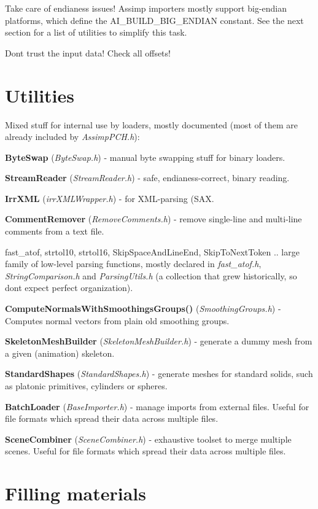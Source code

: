 \begin{DoxyItemize}
\item Take care of endianess issues! Assimp importers mostly support big-\/endian platforms, which define the {\ttfamily A\+I\+\_\+\+B\+U\+I\+L\+D\+\_\+\+B\+I\+G\+\_\+\+E\+N\+D\+I\+A\+N} constant. See the next section for a list of utilities to simplify this task.  
\item Don\textquotesingle{}t trust the input data! Check all offsets!  
\end{DoxyItemize}\hypertarget{extend_util}{}\section{Utilities}\label{extend_util}
Mixed stuff for internal use by loaders, mostly documented (most of them are already included by {\itshape Assimp\+P\+C\+H.\+h})\+: 
\begin{DoxyItemize}
\item {\bfseries Byte\+Swap} ({\itshape Byte\+Swap.\+h}) -\/ manual byte swapping stuff for binary loaders. 
\item {\bfseries Stream\+Reader} ({\itshape Stream\+Reader.\+h}) -\/ safe, endianess-\/correct, binary reading. 
\item {\bfseries Irr\+X\+M\+L} ({\itshape irr\+X\+M\+L\+Wrapper.\+h}) -\/ for X\+M\+L-\/parsing (S\+A\+X. 
\item {\bfseries Comment\+Remover} ({\itshape Remove\+Comments.\+h}) -\/ remove single-\/line and multi-\/line comments from a text file. 
\item fast\+\_\+atof, strtol10, strtol16, Skip\+Space\+And\+Line\+End, Skip\+To\+Next\+Token .. large family of low-\/level parsing functions, mostly declared in {\itshape fast\+\_\+atof.\+h}, {\itshape String\+Comparison.\+h} and {\itshape Parsing\+Utils.\+h} (a collection that grew historically, so don\textquotesingle{}t expect perfect organization).  
\item {\bfseries Compute\+Normals\+With\+Smoothings\+Groups()} ({\itshape Smoothing\+Groups.\+h}) -\/ Computes normal vectors from plain old smoothing groups.  
\item {\bfseries Skeleton\+Mesh\+Builder} ({\itshape Skeleton\+Mesh\+Builder.\+h}) -\/ generate a dummy mesh from a given (animation) skeleton.  
\item {\bfseries Standard\+Shapes} ({\itshape Standard\+Shapes.\+h}) -\/ generate meshes for standard solids, such as platonic primitives, cylinders or spheres.  
\item {\bfseries Batch\+Loader} ({\itshape Base\+Importer.\+h}) -\/ manage imports from external files. Useful for file formats which spread their data across multiple files.  
\item {\bfseries Scene\+Combiner} ({\itshape Scene\+Combiner.\+h}) -\/ exhaustive toolset to merge multiple scenes. Useful for file formats which spread their data across multiple files.  
\end{DoxyItemize}\hypertarget{extend_mat}{}\section{Filling materials}\label{extend_mat}
